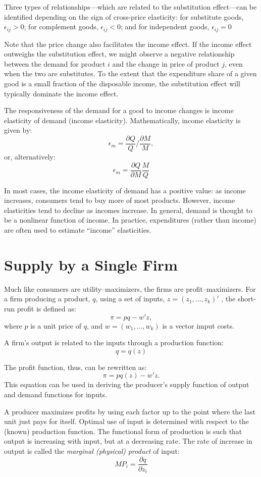 \documentclass[
]{book}
\begin{document}
Three types of relationships---which are related to the substitution effect---can be identified depending on the sign of cross-price elasticity: for substitute goods, \(\epsilon_{ij} > 0\); for complement goods, \(\epsilon_{ij} < 0\); and for independent goods, \(\epsilon_{ij} = 0\)

Note that the price change also facilitates the income effect. If the income effect outweighs the substitution effect, we might observe a negative relationship between the demand for product \(i\) and the change in price of product \(j\), even when the two are substitutes. To the extent that the expenditure share of a given good is a small fraction of the disposable income, the substitution effect will typically dominate the income effect.

The responsiveness of the demand for a good to income changes is income elasticity of demand (income elasticity). Mathematically, income elasticity is given by: \[\epsilon_{m} = \frac{\partial Q}{Q}/\frac{\partial M}{M},\] or, alternatively: \[\epsilon_{m} = \frac{\partial Q}{\partial M}\frac{M}{Q}\]

In most cases, the income elasticity of demand has a positive value: as income increases, consumers tend to buy more of most products. However, income elasticities tend to decline as incomes increase. In general, demand is thought to be a nonlinear function of income. In practice, expenditures (rather than income) are often used to estimate ``income'' elasticities.

\hypertarget{supply-by-a-single-firm}{%
\section{Supply by a Single Firm}\label{supply-by-a-single-firm}}

Much like consumers are utility--maximizers, the firms are profit--maximizers. For a firm producing a product, \(q\), using a set of inputs, \(z=(z_1,\ldots,z_k)'\) , the short-run profit is defined as: \[\pi = pq-w'z,\] where \(p\) is a unit price of \(q\), and \(w=(w_1,\ldots,w_k)\) is a vector imput costs.

A firm's output is related to the inputs through a production function: \[q = q(z)\]

The profit function, thus, can be rewritten as: \[\pi = pq(z)-w'z.\] This equation can be used in deriving the producer's supply function of output and demand functions for inputs.

A producer maximizes profits by using each factor up to the point where the last unit just pays for itself. Optimal use of input is determined with respect to the (known) production function. The functional form of production is such that output is increasing with input, but at a decreasing rate. The rate of increase in output is called the \emph{marginal (physical) product} of input: \[MP_i=\frac{\partial q}{\partial z_i}\]
\end{document}

